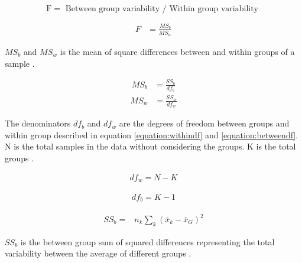 \begin{equation}
\mathrm{F}=\text { Between group variability / Within group variability }
\end{equation}

\begin{equation}
\begin{aligned} F &=\frac{M S_{b}}{M S_{w}}  \end{aligned}
\end{equation}

$MS_b$ and $MS_w$ is the mean of square differences between and within groups of a sample \cite{anova}.

\begin{equation}
\begin{aligned} MS_{b} &=\frac{S S_{b}}{df_b}  \end{aligned}
\end{equation}
\begin{equation}
\begin{aligned} MS_{w} &=\frac{S S_{w}}{df_w}  \end{aligned}
\end{equation}

The denominators $df_b$ and $df_w$ are the degrees of freedom between groups and within group described in equation \ref{equation:withindf} and \ref{equation:betweendf}. N is the total samples in the data without considering the groups. K is the total groups \cite{anova}. 

\begin{equation}
\begin{aligned}
df_{w} = N-K
\end{aligned}
\label{equation:withindf}
\end{equation}

\begin{equation}
\begin{aligned}
df_{b} = K-1
\end{aligned}
\label{equation:betweendf}
\end{equation}

\begin{equation}
\begin{aligned}  SS_{b}=& n_{k} \sum_k\left(\bar{x}_{k}-\bar{x}_{G}\right)^{2} \end{aligned}
\end{equation}

$SS_b$ is the between group sum of squared differences representing the total variability between the average of different groups \cite{anova}. 

